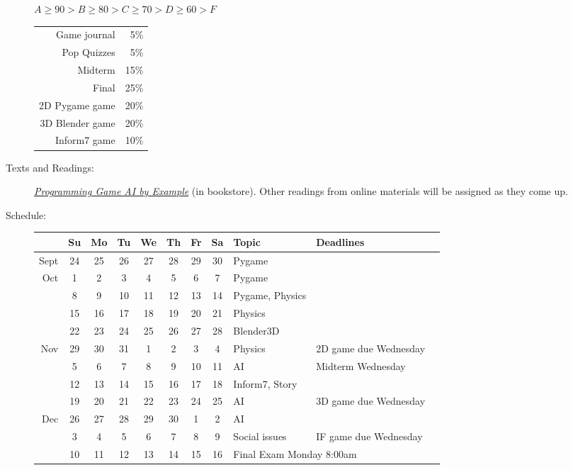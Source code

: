 \documentclass{article}
\begin{document}
\begin{description}
\begin{multicols}{2}
$A \ge 90 > B \ge 80 > C \ge 70 > D \ge 60 > F$

\columnbreak

\begin{centering}
\begin{tabular}{|rr|}\hline
 Game journal &    5\%\\
 Pop Quizzes &     5\%\\
 Midterm &         15\%\\
 Final &           25\%\\
 2D Pygame game &  20\%\\
 3D Blender game & 20\%\\
 Inform7 game &        10\%\\
\hline
\end{tabular}

\end{centering}
\end{multicols}


\item[Texts and Readings:] 


\href{http://www.ai-junkie.com/books/toc_pgaibe.html}
{\em Programming Game AI by Example} (in bookstore).
Other readings from online materials will be assigned as they come up.


\item [Schedule:]\mbox{}

  \begin{tabular}{r|ccccccc|lll}
     &Su& Mo& Tu& We& Th& Fr& Sa&Topic & Deadlines \\\hline  
Sept 
 & 24  & 25  & 26  & 27  & 28  & 29  & 30  & Pygame\\
Oct
&  1  &  2  &  3  &  4  &  5  &  6  &  7  & Pygame\\
 &  8  &  9  & 10  & 11  & 12  & 13  & 14  & Pygame, Physics\\
 & 15  & 16  & 17  & 18  & 19  & 20  & 21  & Physics\\
 & 22  & 23  & 24  & 25  & 26  & 27  & 28  & Blender3D\\
Nov
& 29  & 30  & 31  &  1  &  2  &  3  &  4  & Physics & 2D game due Wednesday\\
 &  5  &  6  &  7  &  8  &  9  & 10  & 11  & AI & Midterm Wednesday\\
 & 12  & 13  & 14  & 15  & 16  & 17  & 18  & Inform7, Story\\
 & 19  & 20  & 21  & 22  & 23  & 24  & 25  & AI & 3D game due Wednesday\\
Dec
& 26  & 27  & 28  & 29  & 30  &  1  &  2  & AI\\
 &  3  &  4  &  5  &  6  &  7  &  8  &  9  &   Social issues &IF game due Wednesday\\\hline
 & 10  & 11  & 12  & 13  & 14  & 15  & 16  & \multicolumn{2}{l}{Final Exam Monday 8:00am }\\
\end{tabular}


\end{description}
\end{document}
